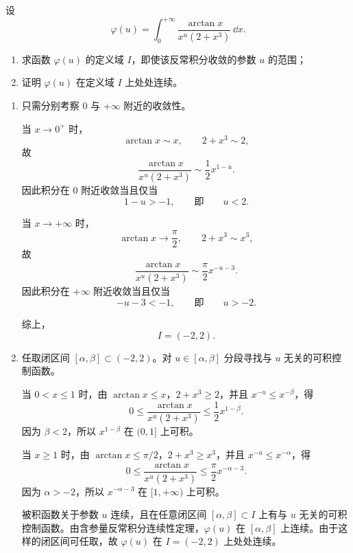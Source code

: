 \begin{question}[15分]
设
\[
  \varphi(u)=\int_0^{+\infty}\frac{\arctan x}{x^u(2+x^3)}\,\dd x.
\]
\begin{enumerate}
  \item 求函数 $\varphi(u)$ 的定义域 $I$，即使该反常积分收敛的参数 $u$ 的范围；
  \item 证明 $\varphi(u)$ 在定义域 $I$ 上处处连续。
\end{enumerate}
\begin{solution}
\begin{enumerate}
  \item 只需分别考察 $0$ 与 $+\infty$ 附近的收敛性。

  当 $x\to0^+$ 时，
  \[
    \arctan x\sim x,\qquad 2+x^3\sim2,
  \]
  故
  \[
    \frac{\arctan x}{x^u(2+x^3)}
    \sim \frac12 x^{1-u}.
  \]
  因此积分在 $0$ 附近收敛当且仅当
  \[
    1-u>-1,
    \qquad\text{即}\qquad u<2.
  \]

  当 $x\to+\infty$ 时，
  \[
    \arctan x\to\frac\pi2,\qquad 2+x^3\sim x^3,
  \]
  故
  \[
    \frac{\arctan x}{x^u(2+x^3)}
    \sim \frac\pi2 x^{-u-3}.
  \]
  因此积分在 $+\infty$ 附近收敛当且仅当
  \[
    -u-3<-1,
    \qquad\text{即}\qquad u>-2.
  \]

  综上，
  \[
    I=(-2,2).
  \]

  \item 任取闭区间 $[\alpha,\beta]\subset(-2,2)$。对 $u\in[\alpha,\beta]$ 分段寻找与 $u$ 无关的可积控制函数。

  当 $0<x\le1$ 时，由 $\arctan x\le x$，$2+x^3\ge2$，并且 $x^{-u}\le x^{-\beta}$，得
  \[
    0\le
    \frac{\arctan x}{x^u(2+x^3)}
    \le
    \frac12 x^{1-\beta}.
  \]
  因为 $\beta<2$，所以 $x^{1-\beta}$ 在 $(0,1]$ 上可积。

  当 $x\ge1$ 时，由 $\arctan x\le\pi/2$，$2+x^3\ge x^3$，并且 $x^{-u}\le x^{-\alpha}$，得
  \[
    0\le
    \frac{\arctan x}{x^u(2+x^3)}
    \le
    \frac{\pi}{2}x^{-\alpha-3}.
  \]
  因为 $\alpha>-2$，所以 $x^{-\alpha-3}$ 在 $[1,+\infty)$ 上可积。

  被积函数关于参数 $u$ 连续，且在任意闭区间 $[\alpha,\beta]\subset I$ 上有与 $u$ 无关的可积控制函数。由含参量反常积分连续性定理，$\varphi(u)$ 在 $[\alpha,\beta]$ 上连续。由于这样的闭区间可任取，故 $\varphi(u)$ 在 $I=(-2,2)$ 上处处连续。
\end{enumerate}
\end{solution}
\end{question}

